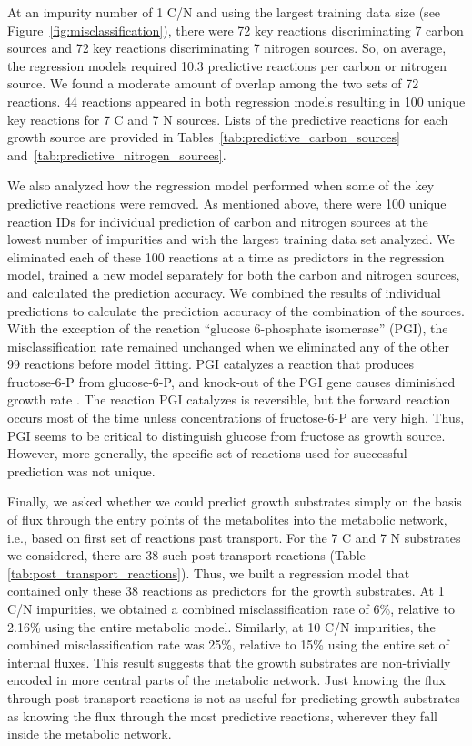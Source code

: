 \documentclass[12pt]{article}
\begin{document}
At an impurity number of 1 C/N and using the largest training data size (see Figure~\ref{fig:misclassification}), there were 72 key reactions discriminating 7 carbon sources and 72 key reactions discriminating 7 nitrogen sources. So, on average, the regression models required 10.3 predictive reactions per carbon or nitrogen source. We found a moderate amount of overlap among the two sets of 72 reactions. 44 reactions appeared in both regression models resulting in 100 unique key reactions for 7 C and 7 N sources. Lists of the predictive reactions for each growth source are provided in Tables~\ref{tab:predictive_carbon_sources} and~\ref{tab:predictive_nitrogen_sources}.

We also analyzed how the regression model performed when some of the key predictive reactions were removed. As mentioned above, there were 100 unique reaction IDs for individual prediction of carbon and nitrogen sources at the lowest number of impurities and with the largest training data set analyzed. We eliminated each of these 100 reactions at a time as predictors in the regression model, trained a new model separately for both the carbon and nitrogen sources, and calculated the prediction accuracy. We combined the results of individual predictions to calculate the prediction accuracy of the combination of the sources. With the exception of the reaction ``glucose 6-phosphate isomerase'' (PGI), the misclassification rate remained unchanged when we eliminated any of the other 99 reactions before model fitting. PGI catalyzes a reaction that produces fructose-6-P from glucose-6-P, and knock-out of the PGI gene causes diminished growth rate \cite{Canonacoetal2001}. The reaction PGI catalyzes is reversible, but the forward reaction occurs most of the time unless concentrations of fructose-6-P are very high. Thus, PGI seems to be critical to distinguish glucose from fructose as growth source. However, more generally, the specific set of reactions used for successful prediction was not unique.

Finally, we asked whether we could predict growth substrates simply on the basis of flux through the entry points of the metabolites into the metabolic network, i.e., based on first set of reactions past transport. For the 7 C and 7 N substrates we considered, there are 38 such post-transport reactions (Table \ref{tab:post_transport_reactions}). Thus, we built a regression model that contained only these 38 reactions as predictors for the growth substrates. At 1 C/N impurities, we obtained a combined misclassification rate of  6\%, relative to 2.16\% using the entire metabolic model. Similarly, at 10 C/N impurities, the combined misclassification rate was 25\%, relative to 15\% using the entire set of internal fluxes. This result suggests that the growth substrates are non-trivially encoded in more central parts of the metabolic network. Just knowing the flux through post-transport reactions is not as useful for predicting growth substrates as knowing the flux through the most predictive reactions, wherever they fall inside the metabolic network.
\end{document}
